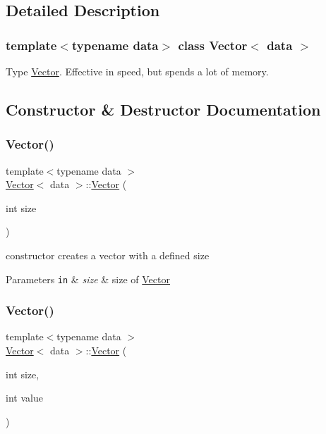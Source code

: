 \subsection{Detailed Description}
\subsubsection*{template$<$typename data$>$\newline
class Vector$<$ data $>$}

Type \hyperlink{classVector}{Vector}. Effective in speed, but spends a lot of memory. 

\subsection{Constructor \& Destructor Documentation}
\mbox{\label{classVector_aba82b0f3e3fd3d17bf2d19b04a8361b7}} 
\subsubsection{\texorpdfstring{Vector()}{Vector()}\hspace{0.1cm}{\footnotesize\ttfamily [1/5]}}
{\footnotesize\ttfamily template$<$typename data $>$ \\
\hyperlink{classVector}{Vector}$<$ data $>$\+::\hyperlink{classVector}{Vector} (\begin{DoxyParamCaption}\item[{int}]{size }\end{DoxyParamCaption})}



constructor  creates a vector with a defined size 


\begin{DoxyParams}[1]{Parameters}
\mbox{\tt in}  & {\em size} & size of \hyperlink{classVector}{Vector} \\
\hline
\end{DoxyParams}
\mbox{\label{classVector_aede0f97bf9e72a66047d90ad8246ded1}} 
\subsubsection{\texorpdfstring{Vector()}{Vector()}\hspace{0.1cm}{\footnotesize\ttfamily [2/5]}}
{\footnotesize\ttfamily template$<$typename data $>$ \\
\hyperlink{classVector}{Vector}$<$ data $>$\+::\hyperlink{classVector}{Vector} (\begin{DoxyParamCaption}\item[{int}]{size,  }\item[{int}]{value }\end{DoxyParamCaption})}



